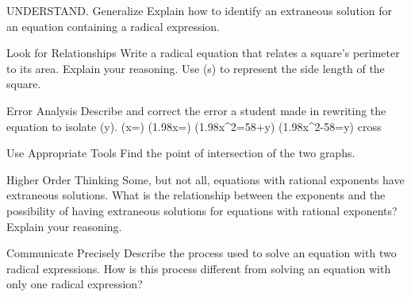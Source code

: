 \documentclass{article}
\newenvironment{practice}[2]{}{}        %
\newcommand{\answer}[1]{}               %
\newcommand{\placeholder}[2]{}          %
\newcommand{\te}[1]{}                   %
\begin{document}
\begin{practice}{15}{2}
UNDERSTAND. Generalize Explain how to identify an extraneous solution for an equation containing a radical expression.
\answer{Substitute each potential solution into the original equation. If it makes the equation true, it is a real solution.}
\end{practice}
\begin{practice}{16}{2}
Look for Relationships Write a radical equation that relates a square's perimeter to its area. Explain your reasoning. Use (s) to represent the side length of the square.
\answer{(P=4\sqrt A); Sample: If (A=s^2), then (s=\sqrt A). Substituting (\sqrt A) for (s) in the perimeter formula results in the given answer.}
\end{practice}
\begin{practice}{17}{2}
Error Analysis Describe and correct the error a student made in rewriting the equation to isolate (y).
(x=)
(1.98x=)
(1.98x^2=58+y)
(1.98x^2-58=y) cross
\answer{The student squared (x) only instead of 1.98 and (x). Here is the correct work: (1.98x=\sqrt{58+y}); (3.92x^2=58+y); (3.92x^2-58=y).}
\te{Printed equality uses rounded 3.92 for (1.98^2=3.9204).}
\end{practice}
\begin{practice}{18}{2}
Use Appropriate Tools Find the point of intersection of the two graphs.
\placeholder{graph}{Red y=10-sqrt(x-8) begins (8,10), decreases right with arrow; blue horizontal y=7 with arrows both ends; no marked intersection. Axes x,y, origin O, x grid 4, labels 8,16,24, window -8 to 32; y grid 2, labels -12,-8,-4,4,8,12, window -14 to 14. Curves labeled in matching colors.}
\answer{(x=17,y=7)}
\end{practice}
\begin{practice}{19}{3}
Higher Order Thinking Some, but not all, equations with rational exponents have extraneous solutions. What is the relationship between the exponents and the possibility of having extraneous solutions for equations with rational exponents? Explain your reasoning.
\answer{Only if the denominator of the rational exponent is even can there be extraneous solutions. Taking an even root of a negative number gives an extraneous solution, so if the root isn't even, there can't be an extraneous solution.}
\te{Answer printed on PDF page 58.}
\end{practice}
\begin{practice}{20}{2}
Communicate Precisely Describe the process used to solve an equation with two radical expressions. How is this process different from solving an equation with only one radical expression?
\answer{The process of solving an equation with two radicals is like solving an equation with one radical. Simplify the equation and square both sides to eliminate one radical; because there are two radicals, you have to square both sides a second time; Rewrite the equation in standard form, and then factor the equation using the Zero-Product Property to solve for the variable. There are additional steps needed to eliminate the second radical.}
\te{Answer printed on PDF page 58.}
\end{practice}
\end{document}
